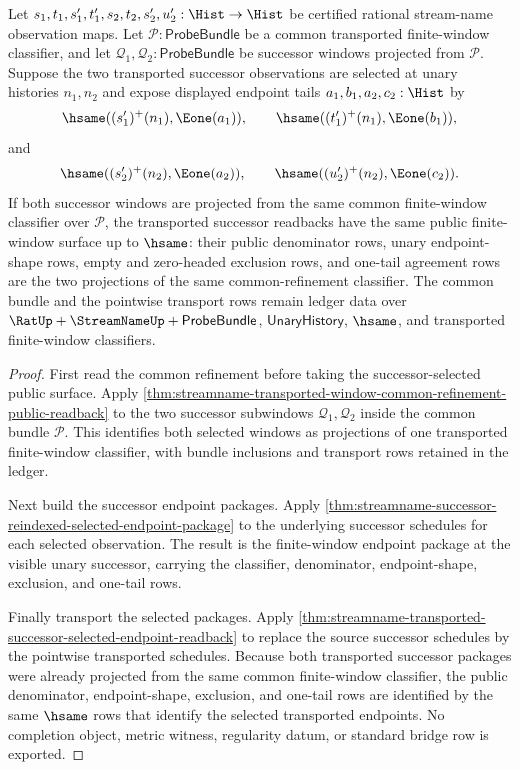 \begin{theorem}
\label{thm:streamname-successor-transported-common-refinement-readback}
Let $s_1,t_1,s_1',t_1',s_2,t_2,s_2',u_2':\Hist\to\Hist$ be certified
rational stream-name observation maps. Let $\mathcal{P}:\mathsf{ProbeBundle}$
be a common transported finite-window classifier, and let
$\mathcal{Q}_1,\mathcal{Q}_2:\mathsf{ProbeBundle}$ be successor windows
projected from $\mathcal{P}$. Suppose the two transported successor
observations are selected at unary histories $n_1,n_2$ and expose displayed
endpoint tails $a_1,b_1,a_2,c_2:\Hist$ by
$$
\hsame((s_1')^{+}(n_1),\Eone(a_1)),
\qquad
\hsame((t_1')^{+}(n_1),\Eone(b_1)),
$$
and
$$
\hsame((s_2')^{+}(n_2),\Eone(a_2)),
\qquad
\hsame((u_2')^{+}(n_2),\Eone(c_2)).
$$
If both successor windows are projected from the same common finite-window
classifier over $\mathcal{P}$, the transported successor readbacks have the
same public finite-window surface up to $\hsame$: their public denominator
rows, unary endpoint-shape rows, empty and zero-headed exclusion rows, and
one-tail agreement rows are the two projections of the same
common-refinement classifier. The common bundle and the pointwise transport
rows remain ledger data over
$\RatUp+\StreamNameUp+\mathsf{ProbeBundle}$, $\mathsf{UnaryHistory}$,
$\hsame$, and transported finite-window classifiers.
\end{theorem}
\begin{proof}
First read the common refinement before taking the successor-selected public
surface. Apply
\autoref{thm:streamname-transported-window-common-refinement-public-readback}
to the two successor subwindows $\mathcal{Q}_1,\mathcal{Q}_2$ inside the common
bundle $\mathcal{P}$. This identifies both selected windows as projections of
one transported finite-window classifier, with bundle inclusions and transport
rows retained in the ledger.

Next build the successor endpoint packages. Apply
\autoref{thm:streamname-successor-reindexed-selected-endpoint-package} to the
underlying successor schedules for each selected observation. The result is the
finite-window endpoint package at the visible unary successor, carrying the
classifier, denominator, endpoint-shape, exclusion, and one-tail rows.

Finally transport the selected packages. Apply
\autoref{thm:streamname-transported-successor-selected-endpoint-readback} to
replace the source successor schedules by the pointwise transported schedules.
Because both transported successor packages were already projected from the
same common finite-window classifier, the public denominator, endpoint-shape,
exclusion, and one-tail rows are identified by the same $\hsame$ rows that
identify the selected transported endpoints. No completion object, metric
witness, regularity datum, or standard bridge row is exported.
\end{proof}

